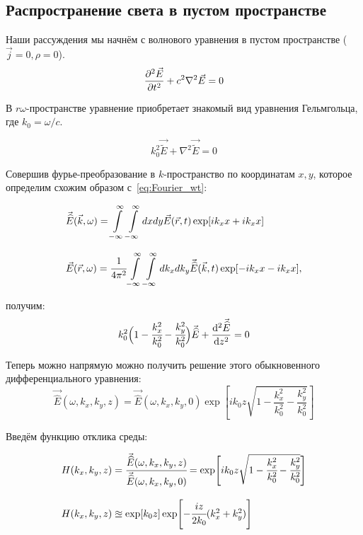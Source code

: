\documentclass[14pt,a4paper]{extarticle}
\numberwithin{equation}{section}
\begin{document}
\subsection{Распространение света в пустом пространстве}
Наши рассуждения мы начнём с волнового уравнения в пустом пространстве ($\vec{j} = 0, \rho = 0$). 
\begin{equation}
	\pdv[2]{\vec{E}}{t} + c^2 \nabla^2 \vec{E} = 0
\end{equation}

В  $r\omega$-пространстве уравнение приобретает знакомый вид уравнения Гельмгольца, где $k_0 = \omega/c$.

\begin{equation}
	k_0^2\vec{\widetilde{E}} + \nabla^2 \vec{\widetilde{E}} = 0
\end{equation}

Совершив фурье-преобразование в $k$-пространство по координатам $x,y$, которое определим схожим образом с~\ref{eq:Fourier_wt}:

\begin{equation}
	\label{eq:Fourier_rk}
	\begin{array}{lcl}
		\vec{\widehat{E}}(\vec{k}, \omega) = \displaystyle\int\limits_{-\infty}^{\infty}\int\limits_{-\infty}^{\infty} dxdy \vec{E}(\vec{r}, t)\exp[ik_xx + ik_xx]\\
		\\
		\vec{E}(\vec{r}, \omega) = \cfrac{1}{4\pi^2}\displaystyle\int\limits_{-\infty}^{\infty}\int\limits_{-\infty}^{\infty} dk_xdk_y \vec{\widehat{E}}(\vec{k}, t)\exp[-ik_xx - ik_xx],
	\end{array}
\end{equation}

получим: 
\begin{equation}
	k_0^2\Big(1 - \cfrac{k^2_x}{k^2_0} - \cfrac{k^2_y}{k^2_0} \Big)\vec{\widehat{E}} + \dv[2]{\vec{\widehat{E}}}{z} = 0
\end{equation}

Теперь можно напрямую можно получить решение этого обыкновенного дифференциального уравнения:
\begin{equation}
	\vec{\widehat{E}}(\omega, k_x, k_y, z) = \vec{\widehat{E}}(\omega, k_x, k_y, 0)\exp[ik_0z\sqrt{1 - \frac{k^2_x}{k^2_0} - \frac{k^2_y}{k^2_0}} ]
\end{equation}

Введём функцию отклика среды:

\begin{equation}
	\begin{array}{lcl}
	H(k_x, k_y, z) = \cfrac{\vec{\widehat{E}}(\omega, k_x, k_y, z)}{\vec{\widehat{E}}(\omega, k_x, k_y, 0)} = \exp[ik_0z\sqrt{1 - \cfrac{k^2_x}{k^2_0} - \cfrac{k^2_y}{k^2_0}} ]
	\\
	\\
	H(k_x, k_y, z) \approxeq \exp[k_0z]\exp[-\cfrac{iz}{2k_0}(k^2_x + k^2_y)]
	\end{array}
\end{equation}
 
\end{document}

